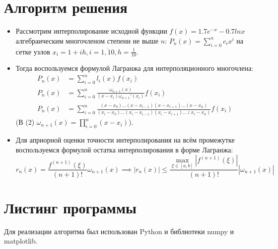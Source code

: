\documentclass[14pt, a4paper]{article}
\begin{document}
  \section{Алгоритм решения}
  \begin{itemize}
     \item
     Рассмотрим интерполирование исходной функции $f(x) = 1.7e^{-x} - 0.7lnx$ алгебраическим многочленом степени не выше $n$: $P_n(x) = \sum\limits_{i = 0}^n c_ix^i$ на сетке узлов $x_i = 1 + ih, i = \overline{1, 10}, h = \frac{1}{10}$.
     \item
     Тогда воспользуемся формулой Лагранжа для интерполяционного многочлена: \begin{align}P_n(x) &= \sum\limits_{i=0}^n l_i(x)f(x_i) \\ P_n(x) &= \sum\limits_{i = 0}^n \frac{\omega_{n+1}(x)}{(x-x_i)\omega_{n+1}'(x_i)}f(x_i) \\ P_n(x) &= \sum\limits_{i=0}^n \frac{(x-x_0)\dots(x-x_{i-1})(x-x_{i+1})\dots(x-x_n)}{(x_i-x_0)\dots(x_i-x_{i-1})(x_i-x_{i+1})\dots(x_i-x_n)}f(x_i)\end{align}
     (В (2) $\omega_{n+1}(x) = \prod\limits_{i=0}^n (x-x_i)$).
     \item
     Для априорной оценки точности интерполирования на всём промежутке воспользуемся формулой остатка интерполирования в форме Лагранжа:
     \begin{equation}r_n(x) = \frac{f^{(n+1)}(\xi)}{(n+1)!}\omega_{n+1}(x) \implies |r_n(x)| \leq \frac{\max\limits_{\xi \in [a, b]} |f^{(n+1)}(\xi)|}{(n+1)!}|\omega_{n+1}(x)| \end{equation}
  \end{itemize}
  \section{Листинг программы}
  Для реализации алгоритма был использован Python и библиотеки numpy и matplotlib.
\end{document}
